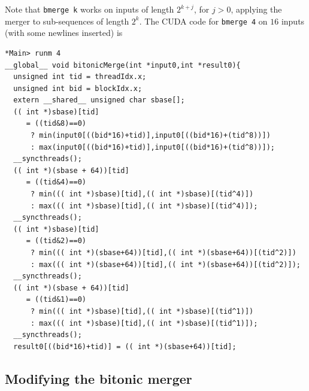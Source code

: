 \noindent
Note that {\tt bmerge k} works on inputs of length {\small }$2^{k+j}$, for $j > 0$, applying the merger to sub-sequences of length {\small $2^k$}.
The CUDA code for {\tt bmerge 4} on $16$ inputs
(with some newlines inserted) is
\begin{codesize}
\begin{verbatim}
*Main> runm 4
__global__ void bitonicMerge(int *input0,int *result0){
  unsigned int tid = threadIdx.x;
  unsigned int bid = blockIdx.x;
  extern __shared__ unsigned char sbase[];
  (( int *)sbase)[tid] 
     = ((tid&8)==0) 
      ? min(input0[((bid*16)+tid)],input0[((bid*16)+(tid^8))]) 
      : max(input0[((bid*16)+tid)],input0[((bid*16)+(tid^8))]);
  __syncthreads();
  (( int *)(sbase + 64))[tid] 
     = ((tid&4)==0) 
      ? min((( int *)sbase)[tid],(( int *)sbase)[(tid^4)]) 
      : max((( int *)sbase)[tid],(( int *)sbase)[(tid^4)]);
  __syncthreads();
  (( int *)sbase)[tid] 
     = ((tid&2)==0) 
      ? min((( int *)(sbase+64))[tid],(( int *)(sbase+64))[(tid^2)]) 
      : max((( int *)(sbase+64))[tid],(( int *)(sbase+64))[(tid^2)]);
  __syncthreads();
  (( int *)(sbase + 64))[tid] 
     = ((tid&1)==0) 
      ? min((( int *)sbase)[tid],(( int *)sbase)[(tid^1)]) 
      : max((( int *)sbase)[tid],(( int *)sbase)[(tid^1)]);
  __syncthreads();
  result0[((bid*16)+tid)] = (( int *)(sbase+64))[tid];
\end{verbatim}
\end{codesize}


\subsection{Modifying the bitonic merger}


